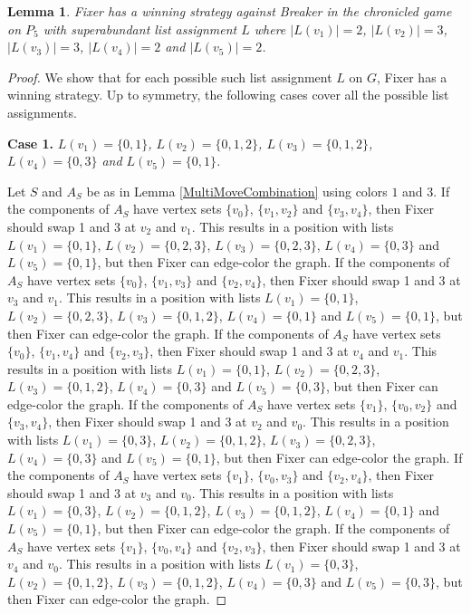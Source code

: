 \documentclass[12pt]{amsart}
\theoremstyle{plain}
\newtheorem{lem}[thm]{Lemma}
\theoremstyle{definition}
\theoremstyle{remark}
\begin{document}
\begin{lem}\label{P5}
Fixer has a winning strategy against Breaker in the chronicled game on $P_5$ with superabundant list assignment $L$ where $|L(v_1)| = 2$, $|L(v_2)| = 3$, $|L(v_3)| = 3$, $|L(v_4)| = 2$ and $|L(v_5)| = 2$.
\end{lem}
\begin{proof}
We show that for each possible such list assignment $L$ on $G$, Fixer has a winning strategy.
Up to symmetry, the following cases cover all the possible list assignments.

\noindent\textbf{Case 1.  }\textit{$L(v_1) = \{0, 1\}$, $L(v_2) = \{0, 1, 2\}$, $L(v_3) = \{0, 1, 2\}$, $L(v_4) = \{0, 3\}$ and $L(v_5) = \{0, 1\}$.}

Let $S$ and $A_S$ be as in Lemma \ref{MultiMoveCombination} using colors $1$ and $3$. If the components of $A_S$ have vertex sets $\{v_0\}$, $\{v_1, v_2\}$ and $\{v_3, v_4\}$, then Fixer should swap 1 and 3 at $v_2$ and $v_1$. This results in a position with lists $L(v_1) = \{0, 1\}$, $L(v_2) = \{0, 2, 3\}$, $L(v_3) = \{0, 2, 3\}$, $L(v_4) = \{0, 3\}$ and $L(v_5) = \{0, 1\}$, but then Fixer can edge-color the graph.
If the components of $A_S$ have vertex sets $\{v_0\}$, $\{v_1, v_3\}$ and $\{v_2, v_4\}$, then Fixer should swap 1 and 3 at $v_3$ and $v_1$. This results in a position with lists $L(v_1) = \{0, 1\}$, $L(v_2) = \{0, 2, 3\}$, $L(v_3) = \{0, 1, 2\}$, $L(v_4) = \{0, 1\}$ and $L(v_5) = \{0, 1\}$, but then Fixer can edge-color the graph.
If the components of $A_S$ have vertex sets $\{v_0\}$, $\{v_1, v_4\}$ and $\{v_2, v_3\}$, then Fixer should swap 1 and 3 at $v_4$ and $v_1$. This results in a position with lists $L(v_1) = \{0, 1\}$, $L(v_2) = \{0, 2, 3\}$, $L(v_3) = \{0, 1, 2\}$, $L(v_4) = \{0, 3\}$ and $L(v_5) = \{0, 3\}$, but then Fixer can edge-color the graph.
If the components of $A_S$ have vertex sets $\{v_1\}$, $\{v_0, v_2\}$ and $\{v_3, v_4\}$, then Fixer should swap 1 and 3 at $v_2$ and $v_0$. This results in a position with lists $L(v_1) = \{0, 3\}$, $L(v_2) = \{0, 1, 2\}$, $L(v_3) = \{0, 2, 3\}$, $L(v_4) = \{0, 3\}$ and $L(v_5) = \{0, 1\}$, but then Fixer can edge-color the graph.
If the components of $A_S$ have vertex sets $\{v_1\}$, $\{v_0, v_3\}$ and $\{v_2, v_4\}$, then Fixer should swap 1 and 3 at $v_3$ and $v_0$. This results in a position with lists $L(v_1) = \{0, 3\}$, $L(v_2) = \{0, 1, 2\}$, $L(v_3) = \{0, 1, 2\}$, $L(v_4) = \{0, 1\}$ and $L(v_5) = \{0, 1\}$, but then Fixer can edge-color the graph.
If the components of $A_S$ have vertex sets $\{v_1\}$, $\{v_0, v_4\}$ and $\{v_2, v_3\}$, then Fixer should swap 1 and 3 at $v_4$ and $v_0$. This results in a position with lists $L(v_1) = \{0, 3\}$, $L(v_2) = \{0, 1, 2\}$, $L(v_3) = \{0, 1, 2\}$, $L(v_4) = \{0, 3\}$ and $L(v_5) = \{0, 3\}$, but then Fixer can edge-color the graph.

\end{proof}
\end{document}
